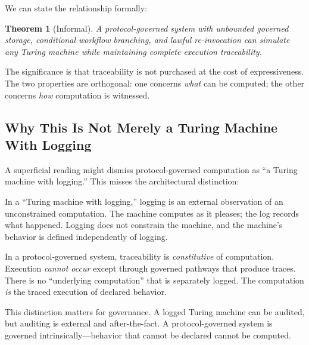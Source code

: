 \documentclass[11pt,a4paper]{article}
\newtheorem{theorem}{Theorem}
\begin{document}
We can state the relationship formally:

\begin{theorem}[Informal]
A protocol-governed system with unbounded governed storage, conditional workflow branching, and lawful re-invocation can simulate any Turing machine while maintaining complete execution traceability.
\end{theorem}

The significance is that traceability is not purchased at the cost of expressiveness. The two properties are orthogonal: one concerns \emph{what} can be computed; the other concerns \emph{how} computation is witnessed.

\subsection{Why This Is Not Merely a Turing Machine With Logging}

A superficial reading might dismiss protocol-governed computation as ``a Turing machine with logging.'' This misses the architectural distinction:

In a ``Turing machine with logging,'' logging is an external observation of an unconstrained computation. The machine computes as it pleases; the log records what happened. Logging does not constrain the machine, and the machine's behavior is defined independently of logging.

In a protocol-governed system, traceability is \emph{constitutive} of computation. Execution \emph{cannot occur} except through governed pathways that produce traces. There is no ``underlying computation'' that is separately logged. The computation \emph{is} the traced execution of declared behavior.

This distinction matters for governance. A logged Turing machine can be audited, but auditing is external and after-the-fact. A protocol-governed system is governed intrinsically---behavior that cannot be declared cannot be computed.
\end{document}
